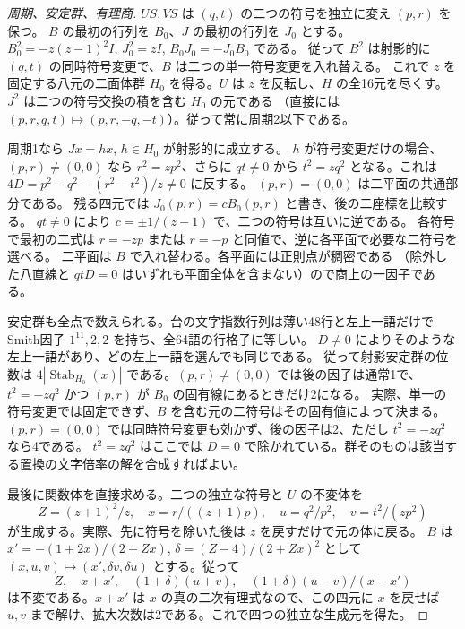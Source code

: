 \begin{proof}[周期、安定群、有理商]
$US,VS$ は $(q,t)$ の二つの符号を独立に変え $(p,r)$ を保つ。
$B$ の最初の行列を $B_0$、$J$ の最初の行列を $J_0$ とする。
$B_0^2=-z(z-1)^2 I$, $J_0^2=zI$, $B_0J_0=-J_0B_0$ である。
従って $B^2$ は射影的に $(q,t)$ の同時符号変更で、$B$ は二つの単一符号変更を入れ替える。
これで $z$ を固定する八元の二面体群 $H_0$ を得る。$U$ は $z$ を反転し、$H$ の全16元を尽くす。
$J^2$ は二つの符号交換の積を含む $H_0$ の元である
（直接には $(p,r,q,t)\mapsto(p,r,-q,-t)$）。従って常に周期2以下である。

周期1なら $Jx=h x$, $h\in H_0$ が射影的に成立する。
$h$ が符号変更だけの場合、$(p,r)\ne(0,0)$ なら $r^2=zp^2$、さらに $qt\ne0$ から
$t^2=zq^2$ となる。これは $4D=p^2-q^2-(r^2-t^2)/z\ne0$ に反する。
$(p,r)=(0,0)$ は二平面の共通部分である。
残る四元では $J_0(p,r)=cB_0(p,r)$ と書き、後の二座標を比較する。
$qt\ne0$ により $c=\pm1/(z-1)$ で、二つの符号は互いに逆である。
各符号で最初の二式は $r=-zp$ または $r=-p$ と同値で、逆に各平面で必要な二符号を選べる。
二平面は $B$ で入れ替わる。各平面には正則点が稠密である
（除外した八直線と $qtD=0$ はいずれも平面全体を含まない）ので商上の一因子である。

安定群も全点で数えられる。台の文字指数行列は薄い48行と左上一語だけで
Smith因子 $1^{11},2,2$ を持ち、全64語の行格子に等しい。
$D\ne0$ によりそのような左上一語があり、どの左上一語を選んでも同じである。
従って射影安定群の位数は $4|\operatorname{Stab}_{H_0}(x)|$ である。$(p,r)\ne(0,0)$
では後の因子は通常1で、$t^2=-zq^2$ かつ $(p,r)$ が $B_0$ の固有線にあるときだけ2になる。
実際、単一の符号変更では固定できず、$B$ を含む元の二符号はその固有値によって決まる。
$(p,r)=(0,0)$ では同時符号変更も効かず、後の因子は2、ただし $t^2=-zq^2$ なら4である。
$t^2=zq^2$ はここでは $D=0$ で除かれている。群そのものは該当する置換の文字倍率の解を合成すればよい。

最後に関数体を直接求める。二つの独立な符号と $U$ の不変体を
\[
 Z=(z+1)^2/z,\quad x=r/((z+1)p),\quad u=q^2/p^2,\quad v=t^2/(zp^2)
\]
が生成する。実際、先に符号を除いた後は $z$ を戻すだけで元の体に戻る。
$B$ は $x'=-(1+2x)/(2+Zx)$, $\delta=(Z-4)/(2+Zx)^2$ として
$(x,u,v)\mapsto(x',\delta v,\delta u)$ とする。従って
\[
  Z,\quad x+x',\quad (1+\delta)(u+v),\quad
  (1+\delta)(u-v)/(x-x')
\]
は不変である。$x+x'$ は $x$ の真の二次有理式なので、この四元に $x$ を戻せば
$u,v$ まで解け、拡大次数は2である。これで四つの独立な生成元を得た。
\end{proof}
